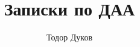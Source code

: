 \documentclass[openany, 12pt]{book}
\theoremstyle{definition}
\theoremstyle{plain}
\theoremstyle{remark}
\theoremstyle{definition}
\begin{document}
\begin{titlepage}
    \title{Записки по ДАА}
    \author{Тодор Дуков}
    \date{}
\end{titlepage}

\maketitle

\tableofcontents



\end{document}
